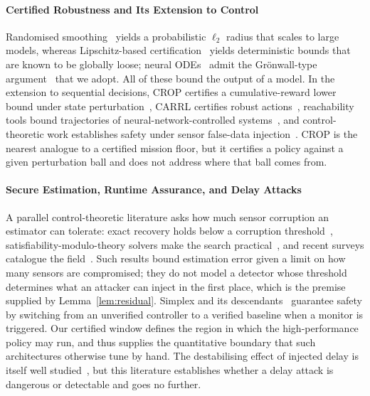 \paragraph{Certified Robustness and Its Extension to Control}
Randomised smoothing~\cite{cohen2019smoothing,salman2019provably} yields a
probabilistic $\ell_2$ radius that scales to large models, whereas
Lipschitz-based certification~\cite{pauli2022training,zhang2022rethinking}
yields deterministic bounds that are known to be globally loose; neural
ODEs~\cite{chen2018neuralode} admit the Gr\"onwall-type
argument~\cite{yan2020robustnode} that we adopt. All of these bound the output
of a model. In the extension to sequential decisions, CROP certifies a
cumulative-reward lower bound under state perturbation~\cite{wu2022crop}, CARRL
certifies robust actions~\cite{everett2021carrl}, reachability tools bound
trajectories of neural-network-controlled systems~\cite{ivanov2019verisig,tran2020nnv},
and control-theoretic work establishes safety under sensor false-data
injection~\cite{li2022lqg}. CROP is the nearest analogue to a certified mission
floor, but it certifies a policy against a given perturbation ball and does not
address where that ball comes from.

\paragraph{Secure Estimation, Runtime Assurance, and Delay Attacks}
A parallel control-theoretic literature asks how much sensor corruption an
estimator can tolerate: exact recovery holds below a corruption
threshold~\cite{fawzi2014secure}, satisfiability-modulo-theory solvers make the
search practical~\cite{shoukry2017smt}, and recent surveys catalogue the
field~\cite{ding2021survey}. Such results bound estimation error given a limit
on how many sensors are compromised; they do not model a detector whose threshold determines
what an attacker can inject in the first place, which is the premise supplied by
Lemma~\ref{lem:residual}. Simplex and its
descendants~\cite{sha2001simplex,mehmood2022blackbox,cofer2020rta} guarantee
safety by switching from an unverified controller to a verified baseline when a
monitor is triggered. Our certified window defines the region in which the
high-performance policy may run, and thus supplies the quantitative boundary
that such architectures otherwise tune by hand. The destabilising effect of
injected delay is itself well studied~\cite{lou2019timedelay,etd2023uav,datamut2026},
but this literature establishes whether a delay attack is dangerous or
detectable and goes no further.

